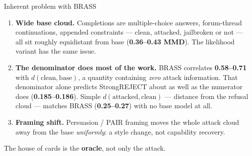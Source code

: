 \documentclass[aspectratio=169,10pt]{beamer}
\begin{document}
\begin{frame}{Inherent problem with BRASS}
\begin{enumerate}\itemsep=0.65em
  \item \textbf{Wide base cloud.} Completions are multiple-choice answers, forum-thread continuations, appended constraints --- clean, attacked, jailbroken or not --- all sit roughly equidistant from base (\textbf{0.36--0.43 MMD}). The likelihood variant has the same issue.

  \item \textbf{The denominator does most of the work.} BRASS correlates \textbf{0.58--0.71} with $d(\mathrm{clean},\mathrm{base})$, a quantity containing \emph{zero} attack information. That denominator alone predicts StrongREJECT about as well as the numerator does (\textbf{0.185--0.186}). Simple $d(\mathrm{attacked},\mathrm{clean})$ --- distance from the refusal cloud --- matches BRASS (\textbf{0.25--0.27}) with no base model at all.

  \item \textbf{Framing shift.} Persuasion / PAIR framing moves the whole attack cloud away from the base \emph{uniformly}: a style change, not capability recovery.
\end{enumerate}
\vspace{0.35em}
\centering
{\large The house of cards is the \textbf{oracle}, not only the attack.}
\end{frame}
\end{document}
